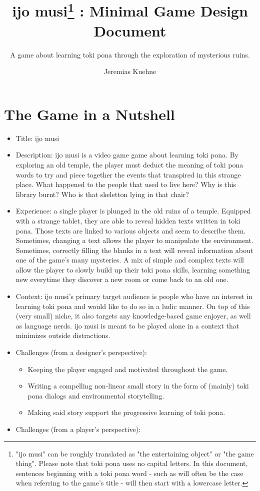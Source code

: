 \documentclass{scrartcl}
\title{ijo musi\footnote{"ijo musi" can be roughly translated as "the entertaining object" or "the game thing". Please note that toki pona uses no capital letters. In this document, sentences beginning with a toki pona word - such as will often be the case when referring to the game's title - will then start with a lowercase letter.} : Minimal Game Design Document}
\subtitle{A game about learning toki pona through the exploration of mysterious ruins.}
\author{Jeremias Kuehne}
\begin{document}
	
	\maketitle
	\clearpage
	
	\section{The Game in a Nutshell}
		\begin{itemize}
			\item Title: ijo musi
			\item Description: ijo musi is a video game game about learning toki pona. By exploring an old temple, the player must deduct the meaning of toki pona words to try and piece together the events that transpired in this strange place. What happened to the people that used to live here? Why is this library burnt? Who is that skeletton lying in that chair?
			\item Experience: a single player is plunged in the old ruins of a temple. Equipped with a strange tablet, they are able to reveal hidden texts written in toki pona. Those texts are linked to various objects and seem to describe them. Sometimes, changing a text allows the player to manipulate the environment. Sometimes, correctly filling the blanks in a text will reveal information about one of the game's many mysteries. A mix of simple and complex texts will allow the player to slowly build up their toki pona skills, learning something new everytime they discover a new room or come back to an old one.
			\item Context: ijo musi's primary target audience is people who have an interest in learning toki pona and would like to do so in a ludic manner. On top of this (very small) niche, it also targets any knowledge-based game enjoyer, as well as language nerds. ijo musi is meant to be played alone in a context that minimizes outside distractions.
			\item Challenges (from a designer's perspective): 
				\begin{itemize}
					\item Keeping the player engaged and motivated throughout the game. 
					\item Writing a compelling non-linear small story in the form of (mainly) toki pona dialogs and environmental storytelling.
					\item Making said story support the progressive learning of toki pona.
				\end{itemize}
			\item Challenges (from a player's perspective):

\end{itemize}
\end{document}
